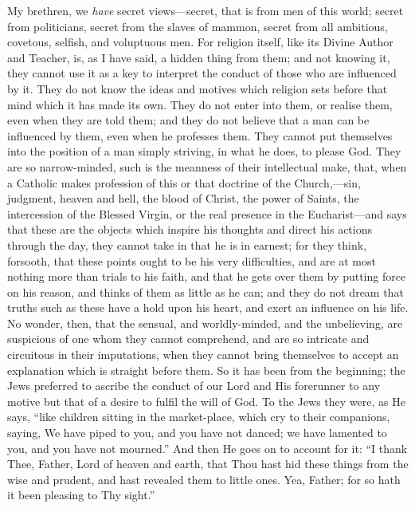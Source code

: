 My brethren, we \emph{have} secret views—secret, that is from men
of this world; secret from politicians, secret from the slaves of
mammon, secret from all ambitious, covetous, selfish, and voluptuous
men. For religion itself, like its Divine Author and Teacher, is, as I
have said, a hidden thing from them; and not knowing it, they cannot
use it as a key to interpret the conduct of those who are influenced
by it. They do not know the ideas and motives which religion sets
before that mind which it has made its own. They do not enter into
them, or realise them, even when they are told them; and they do not
believe that a man can be influenced by them, even when he professes
them. They cannot put themselves into the position of a man simply
striving, in what he does, to please God. They are so narrow-minded,
such is the meanness of their intellectual make, that, when a Catholic
makes profession of this or that doctrine of the Church,—sin,
judgment, heaven and hell, the blood of Christ, the power of Saints,
the intercession of the Blessed Virgin, or the real presence in the
Eucharist—and says that these are the objects which inspire his
thoughts and direct his actions through the day, they cannot take in
that he is in earnest; for they think, forsooth, that these points
ought to be his very difficulties, and are at most nothing more than
trials to his faith, and that he gets over them by putting force on
his reason, and thinks of them as little as he can; and they do not
dream that truths such as these have a hold upon his heart, and exert
an influence on his life. No wonder, then, that the sensual, and
worldly-minded, and the unbelieving, are suspicious of one whom they
cannot comprehend, and are so intricate and circuitous in their
imputations, when they cannot bring themselves to accept an
explanation which is straight before them. So it has been from the
beginning; the Jews preferred to ascribe the conduct of our Lord and
His forerunner to any motive but that of a desire to fulfil the will
of God. To the Jews they were, as He says, ``like children sitting
in the market-place, which cry to their companions, saying, We have
piped to you, and you have not danced; we have lamented to you, and
you have not mourned.'' And then He goes on to account for it:
``I thank Thee, Father, Lord of heaven and earth, that Thou hast
hid these things from the wise and prudent, and hast revealed them to
little ones. Yea, Father; for so hath it been pleasing to Thy
sight.''


